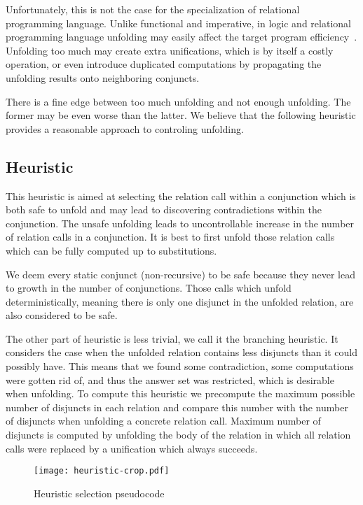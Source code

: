 Unfortunately, this is not the case for the specialization of relational programming language.
Unlike functional and imperative, in logic and relational programming language unfolding may easily affect the target program efficiency~\cite{leuschel2002logic}.
Unfolding too much may create extra unifications, which is by itself a costly operation, or even introduce duplicated computations by propagating the unfolding results onto neighboring conjuncts.

There is a fine edge between too much unfolding and not enough unfolding.
The former may be even worse than the latter.
We believe that the following heuristic provides a reasonable approach to controling unfolding.

\subsection{Heuristic}
\label{sec:heurictic}

This heuristic is aimed at selecting the relation call within a conjunction which is both safe to unfold and may lead to discovering contradictions within the conjunction.
The unsafe unfolding leads to uncontrollable increase in the number of relation calls in a conjunction.
It is best to first unfold those relation calls which can be fully computed up to substitutions.

We deem every static conjunct (non-recursive) to be safe because they never lead to growth in the number of conjunctions.
Those calls which unfold deterministically, meaning there is only one disjunct in the unfolded relation, are also considered to be safe.

The other part of heuristic is less trivial, we call it the branching heuristic.
It considers the case when the unfolded relation contains less disjuncts than it could possibly have.
This means that we found some contradiction, some computations were gotten rid of, and thus the answer set was restricted, which is desirable when unfolding.
To compute this heuristic we precompute the maximum possible number of disjuncts in each relation and compare this number with the number of disjuncts when unfolding a concrete relation call.
Maximum number of disjuncts is computed by unfolding the body of the relation in which all relation calls were replaced by a unification which always succeeds.


\begin{figure}[h!]
  \centering
  \texttt{[image: heuristic-crop.pdf]}
  \caption{Heuristic selection pseudocode}
  \label{fig:heu-pseudo}
\end{figure}

